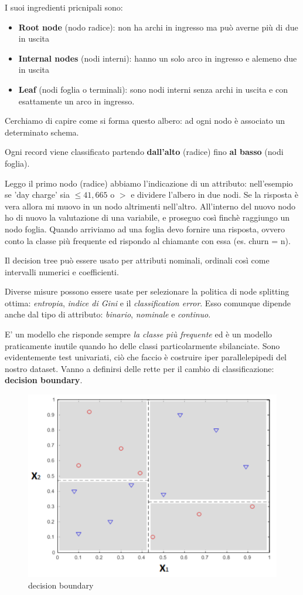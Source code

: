 I suoi ingredienti pricnipali sono:
\begin{itemize}
	\item \textbf{Root node} (nodo radice): non ha archi in ingresso ma può averne più di due in uscita
	\item \textbf{Internal nodes} (nodi interni): hanno un solo arco in ingresso e alemeno due in uscita
	\item \textbf{Leaf} (nodi foglia o terminali): sono nodi interni senza archi in uscita e con esattamente un arco in ingresso.
\end{itemize}

Cerchiamo di capire come si forma questo albero: ad ogni nodo è associato un determinato schema.

Ogni record viene classificato partendo \textbf{dall'alto} (radice) fino \textbf{al basso} (nodi foglia).

Leggo il primo nodo (radice) abbiamo l'indicazione di un attributo: nell'esempio se 'day charge' sia $\le 41,665$ o  $>$ e dividere l'albero in due nodi. Se la risposta è vera allora mi muovo in un nodo altrimenti nell'altro. All'interno del nuovo nodo ho di nuovo la valutazione di una variabile, e proseguo cos\`i finch\`e raggiungo un nodo foglia.
Quando arriviamo ad una foglia devo fornire una risposta, ovvero conto la classe più frequente ed rispondo al chiamante con essa (es. churn = n).

Il decision tree può essere usato per attributi nominali, ordinali così come intervalli numerici e coefficienti.
 
Diverse misure possono essere usate per selezionare la politica di node splitting ottima: \textit{entropia}, \textit{indice di Gini} e il \textit{classification error}. Esso comunque dipende anche dal tipo di attributo: \textit{binario}, \textit{nominale} e \textit{continuo}. 

E' un modello che risponde sempre \textit{la classe più frequente} ed è un modello praticamente inutile quando ho delle classi particolarmente sbilanciate. Sono evidentemente test univariati, ciò che faccio è costruire iper parallelepipedi del nostro dataset. Vanno a definirsi delle rette per il cambio di classificazione: \textbf{decision boundary}.

\begin{figure}[H]
	\centering
	\includegraphics[height=0.5 \linewidth]{classification/pict/decision_boundary.png}
	\caption{decision boundary}
\end{figure}


